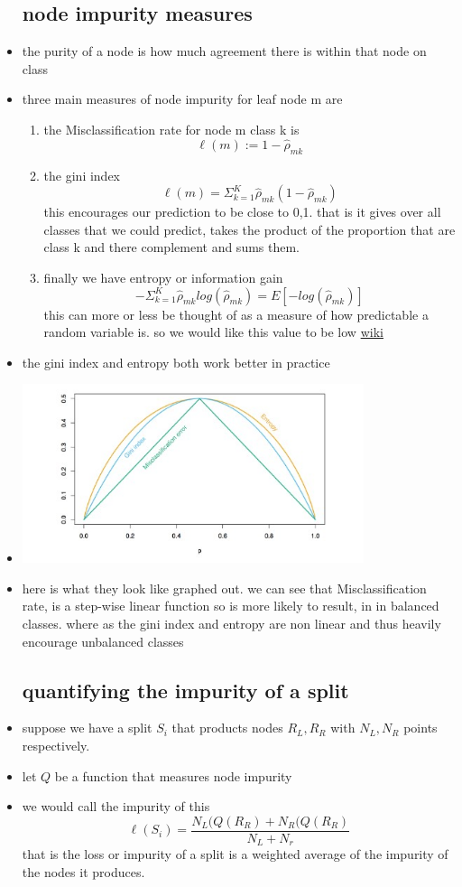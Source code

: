 \documentclass{article}
\begin{document}
\begin{itemize}
\subsection*{node impurity measures}
\item the purity of a node is how much agreement there is within that node on class
\item three main measures of node impurity for leaf node m  are
\begin{enumerate}
    \item the Misclassification  rate for node m class k is  $$\ell(m):=1-\hat{\rho}_{mk}$$
    \item the gini index $$\ell(m)=\Sigma_{k=1}^{K}\hat{\rho}_{mk}(1-\hat{\rho}_{mk})$$ this encourages our prediction to be close to 0,1. that is it gives over all classes that we could predict, takes the product of the proportion that are class k and there complement and sums them.
    \item finally we have entropy or information gain $$-\Sigma_{k=1}^{K}\hat{\rho}_{mk}log(\hat{\rho}_{mk})=E[-log(\hat{\rho}_{mk})]$$
    this can more or less be thought of as a measure of how predictable a random variable is. so we would like this value to be low \href{https://en.wikipedia.org/wiki/Entropy_(information_theory)}{wiki}
\end{enumerate}
\item the gini index and entropy both work better in practice
\item \includegraphics[width=10cm]{lecture_notes/lecture_9/immages/l9_4.jpg}
\item here is what they look like graphed out. we can see that Misclassification rate, is a step-wise  linear function so is more likely to result, in in balanced classes. where as the gini index and entropy are non linear and thus heavily encourage unbalanced classes
\subsection*{quantifying the impurity of a split }
\item suppose we have a split $S_i$ that products nodes $R_L, R_R$ with $N_L, N_R$ points respectively. 
\item let $Q$ be a function that measures node impurity
\item we would call the impurity of this $$\ell(S_i)=\frac{N_L(Q(R_R)+N_R(Q(R_R)}{N_L+N_r}$$ that is the loss or impurity of a split is a weighted average of the impurity of the nodes it produces. 

\end{itemize}
\end{document}
